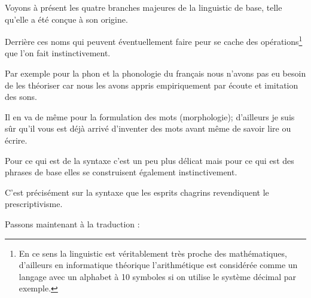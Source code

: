 Voyons à présent les quatre branches majeures de la \gls{linguistic} de
base, telle qu'elle a été conçue à son origine.

\begin{center}
\begin{mdframed}[style=citestyle, frametitle={Extrait de~\cite{burleigh}}]
\end{mdframed}  
\end{center}

Derrière ces noms qui peuvent éventuellement faire peur se cache des
opérations\footnote{En ce sens la \gls{linguistic} est véritablement très
  proche des mathématiques, d'ailleurs en informatique théorique
  l'arithmétique est considérée comme un langage avec un alphabet à 10
symboles si on utilise le système décimal par exemple.} que l'on fait
instinctivement.

Par exemple pour la \gls{phon} et la phonologie du français nous
n'avons pas eu besoin de les théoriser car nous les avons appris
empiriquement par écoute et imitation des sons.

Il en va de même pour la formulation des mots (morphologie); d'ailleurs je suis sûr
qu'il vous est déjà arrivé d'inventer des mots avant même de savoir
lire ou écrire.

Pour ce qui est de la syntaxe c'est un peu plus délicat mais pour ce
qui est des phrases de base elles se construisent également
instinctivement.

C'est précisément sur la syntaxe que les esprits chagrins revendiquent le prescriptivisme.


Passons maintenant à la traduction :

